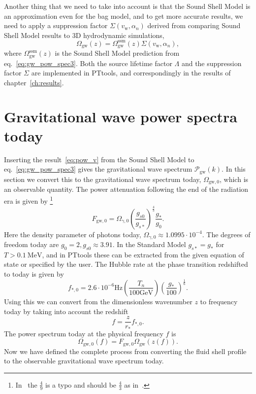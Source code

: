 Another thing that we need to take into account is that the Sound Shell Model is an approximation even for the bag model,
and to get more accurate results,
we need to apply a suppression factor $\Sigma(v_\text{w},\alpha_n)$ derived from comparing Sound Shell Model results to 3D hydrodynamic simulations,
\cite[eq. 2.9]{gowling_lisa_2021}
\begin{equation}
\Omega_\text{gw}(z) = \Omega_\text{gw}^\text{ssm}(z) \Sigma(v_\text{w},\alpha_n),
\end{equation}
where $\Omega_\text{gw}^\text{ssm}(z)$ is the Sound Shell Model prediction from eq.~\eqref{eq:gw_pow_spec3}.
Both the source lifetime factor $\Lambda$ and the suppression factor $\Sigma$ are implemented in PTtools,
and correspondingly in the results of chapter~\ref{ch:results}.


\section{Gravitational wave power spectra today}
\label{omgw0}
Inserting the result~\eqref{eq:pow_v} from the Sound Shell Model to eq.~\eqref{eq:gw_pow_spec3} gives the gravitational wave spectrum $\mathcal{P}_\text{gw}(k)$.
In this section we convert this to the gravitational wave spectrum today, $\Omega_{\text{gw},0}$, which is an observable quantity.
The power attenuation following the end of the radiation era is given by
\cites[eq. 2.11]{gowling_lisa_2021}[eq. 19]{caprini_detecting_2020}%
\footnote{In~\cite[eq. 2.11]{gowling_lisa_2021} the $\frac{4}{9}$ is a typo and should be $\frac{4}{3}$ as in~\cite[eq. 19]{caprini_detecting_2020}.}
\begin{equation}
F_{\text{gw},0} = \Omega_{\gamma,0} \left( \frac{g_{s0}}{g_{s*}} \right)^\frac{4}{3} \frac{g_*}{g_0}.
\end{equation}
Here the density parameter of photons today, $\Omega_{\gamma,0} \approx 1.0995 \cdot 10^{-4}$.
The degrees of freedom today are $g_0 = 2, g_{s0} \approx 3.91$.
In the Standard Model $g_{s*} = g_*$ for $T > 0.1 \ \text{MeV}$,
and in PTtools these can be extracted from the given equation of state or specified by the user.
The Hubble rate at the phase transition redshifted to today is given by
\cites[eq. 2.13]{gowling_lisa_2021}[eq. 31]{caprini_detecting_2020}
\begin{equation}
f_{*,0} = 2.6 \cdot 10^{-6} \text{Hz} \left( \frac{T_n}{100 \text{GeV}} \right) \left( \frac{g_*}{100} \right)^\frac{1}{6}.
\end{equation}
Using this we can convert from the dimensionless wavenumber $z$ to frequency today by taking into account the redshift
\cite[eq. 2.12]{gowling_lisa_2021}
\begin{equation}
f = \frac{z}{r_*} f_{*,0}.
\end{equation}
The power spectrum today at the physical frequency $f$ is
\cite[eq. 2.10]{gowling_lisa_2021}
\begin{equation}
\Omega_{\text{gw},0}(f) = F_{\text{gw},0} \Omega_\text{gw}(z(f)).
\end{equation}
Now we have defined the complete process from converting the fluid shell profile to the observable gravitational wave spectrum today.


